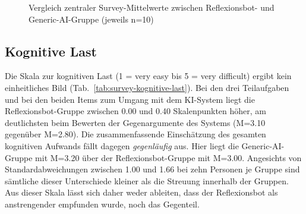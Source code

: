 \begin{figure}[htb]
\centering
{}
\caption[Vergleich zentraler Survey-Mittelwerte]{Vergleich zentraler Survey-Mittelwerte zwischen
Reflexionsbot- und Generic-AI-Gruppe (jeweils n=10)}
\label{fig:survey-vergleich}
\end{figure}

\subsection*{Kognitive Last}
Die Skala zur kognitiven Last (1 = very easy bis 5 = very difficult) ergibt kein einheitliches Bild
(Tab.~\ref{tab:survey-kognitive-last}). Bei den drei Teilaufgaben und bei den beiden Items zum Umgang
mit dem KI-System liegt die Reflexionsbot-Gruppe zwischen 0.00 und 0.40 Skalenpunkten höher, am
deutlichsten beim Bewerten der Gegenargumente des Systems (M=3.10 gegenüber M=2.80). Die
zusammenfassende Einschätzung des gesamten kognitiven Aufwands fällt dagegen \emph{gegenläufig} aus.
Hier liegt die Generic-AI-Gruppe mit M=3.20 über der Reflexionsbot-Gruppe mit M=3.00. Angesichts von
Standardabweichungen zwischen 1.00 und 1.66 bei zehn Personen je Gruppe sind sämtliche dieser
Unterschiede kleiner als die Streuung innerhalb der Gruppen. Aus dieser Skala lässt sich daher weder
ableiten, dass der Reflexionsbot als anstrengender empfunden wurde, noch das Gegenteil.

